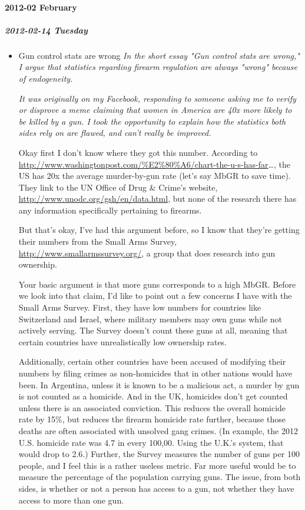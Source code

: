 \documentclass[11pt]{article}
\begin{document}
\paragraph*{2012-02 February}
\label{sec:orgf4f2738}
\startcontents[level-4]
\subparagraph*{2012-02-14 Tuesday}
\label{sec:org6accfe7}
\begin{itemize}
\item Gun control stats are wrong
\label{sec:orgc21d5cf}
\emph{In the short essay "Gun control stats are wrong," I argue that statistics regarding firearm regulation are always "wrong" because of endogeneity.}

\emph{It was originally on my Facebook, responding to someone asking me to verify or disprove a meme claiming that women in America are 40x more likely to be killed by a gun. I took the opportunity to explain how the statistics both sides rely on are flawed, and can’t really be improved.}

Okay first I don’t know where they got this number. According to \url{http://www.washingtonpost.com/\%E2\%80\%A6/chart-the-u-s-has-far}…, the US has 20x the average murder-by-gun rate (let’s say MbGR to save time). They link to the UN Office of Drug \& Crime’s website, \url{http://www.unodc.org/gsh/en/data.html}, but none of the research there has any information specifically pertaining to firearms.

But that’s okay, I’ve had this argument before, so I know that they’re getting their numbers from the Small Arms Survey, \url{http://www.smallarmssurvey.org/}, a group that does research into gun ownership.

Your basic argument is that more guns corresponds to a high MbGR. Before we look into that claim, I’d like to point out a few concerns I have with the Small Arms Survey. First, they have low numbers for countries like Switzerland and Israel, where military members may own guns while not actively serving. The Survey doesn’t count these guns at all, meaning that certain countries have unrealistically low ownership rates.

Additionally, certain other countries have been accused of modifying their numbers by filing crimes as non-homicides that in other nations would have been. In Argentina, unless it is known to be a malicious act, a murder by gun is not counted as a homicide. And in the UK, homicides don’t get counted unless there is an associated conviction. This reduces the overall homicide rate by 15\%, but reduces the firearm homicide rate further, because those deaths are often associated with unsolved gang crimes. (In example, the 2012 U.S. homicide rate was 4.7 in every 100,00. Using the U.K.’s system, that would drop to 2.6.) Further, the Survey measures the number of guns per 100 people, and I feel this is a rather useless metric. Far more useful would be to measure the percentage of the population carrying guns. The issue, from both sides, is whether or not a person has access to a gun, not whether they have access to more than one gun.


\end{itemize}
\end{document}
